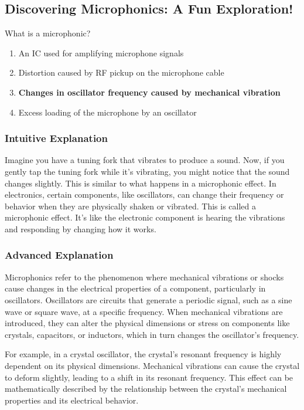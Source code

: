 \subsection{Discovering Microphonics: A Fun Exploration!}

\begin{tcolorbox}[colback=gray!10!white,colframe=black!75!black,title=E7H02] What is a microphonic?  
    \begin{enumerate}[label=\Alph*,noitemsep]
        \item An IC used for amplifying microphone signals
        \item Distortion caused by RF pickup on the microphone cable
        \item \textbf{Changes in oscillator frequency caused by mechanical vibration}
        \item Excess loading of the microphone by an oscillator
    \end{enumerate}
\end{tcolorbox}

\subsubsection{Intuitive Explanation}
Imagine you have a tuning fork that vibrates to produce a sound. Now, if you gently tap the tuning fork while it's vibrating, you might notice that the sound changes slightly. This is similar to what happens in a microphonic effect. In electronics, certain components, like oscillators, can change their frequency or behavior when they are physically shaken or vibrated. This is called a microphonic effect. It’s like the electronic component is hearing the vibrations and responding by changing how it works.

\subsubsection{Advanced Explanation}
Microphonics refer to the phenomenon where mechanical vibrations or shocks cause changes in the electrical properties of a component, particularly in oscillators. Oscillators are circuits that generate a periodic signal, such as a sine wave or square wave, at a specific frequency. When mechanical vibrations are introduced, they can alter the physical dimensions or stress on components like crystals, capacitors, or inductors, which in turn changes the oscillator's frequency.

For example, in a crystal oscillator, the crystal's resonant frequency is highly dependent on its physical dimensions. Mechanical vibrations can cause the crystal to deform slightly, leading to a shift in its resonant frequency. This effect can be mathematically described by the relationship between the crystal's mechanical properties and its electrical behavior.

